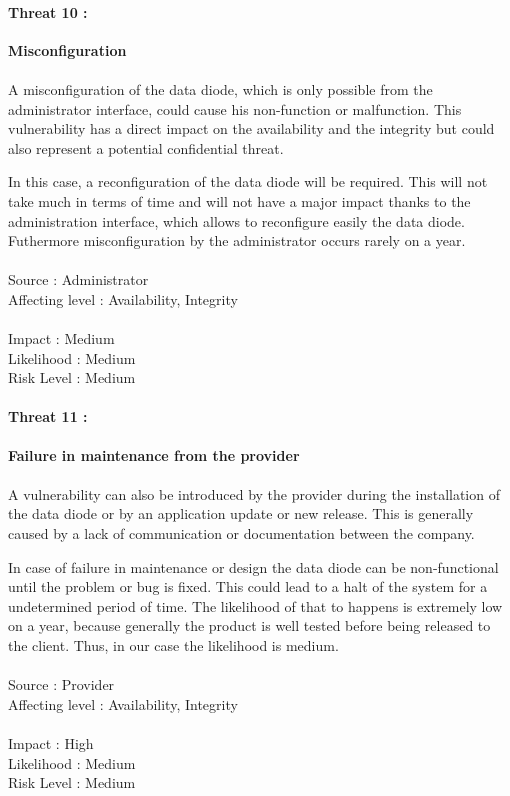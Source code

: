 \documentclass[a4paper,10pt]{article}
\begin{document}
\paragraph{Threat 10 :}  \textbf{Misconfiguration} 
\paragraph{}A misconfiguration of the data diode, which is only possible from the administrator interface, could cause his non-function or malfunction. This vulnerability has a direct impact on the availability and the integrity but could also represent a potential confidential threat.

In this case, a reconfiguration of the data diode will be required. This will not take much in terms of time and will not have a major impact thanks to the administration interface, which allows to reconfigure easily the data diode. Futhermore misconfiguration by the administrator occurs rarely on a year.\\ \\ 
Source : Administrator \\ 
Affecting level : Availability, Integrity \\ \\
Impact : Medium \\
Likelihood : Medium \\
Risk Level : Medium

\paragraph{Threat 11 :}  \textbf{Failure in maintenance from the provider}
\paragraph{}A vulnerability can also be introduced by the provider during the installation of the data diode or by an application update or new release. This is generally caused by a lack of communication or documentation between the company.

In case of failure in maintenance or design the data diode can be non-functional until the problem or bug is fixed. This could lead to a halt of the system for a undetermined period of time. The likelihood of that to happens is extremely low on a year, because generally the product is well tested before being released to the client. Thus, in our case the likelihood is medium.  \\  \\ 
Source : Provider \\ 
Affecting level : Availability, Integrity  \\ \\
Impact : High \\
Likelihood : Medium \\
Risk Level : Medium
\end{document}
